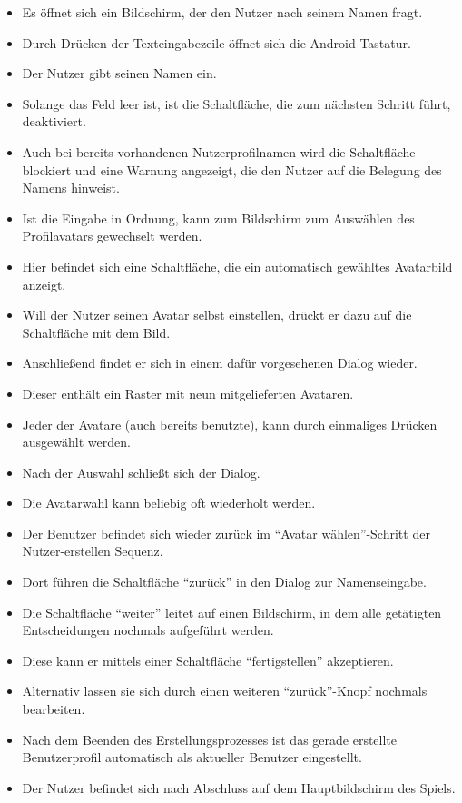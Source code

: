 \begin{itemize}
\item Es öffnet sich ein Bildschirm, der den Nutzer nach seinem Namen fragt.
\item Durch Drücken der Texteingabezeile öffnet sich die Android Tastatur.
\item Der Nutzer gibt seinen Namen ein. 
\item Solange das Feld leer ist, ist die Schaltfläche, die zum nächsten Schritt führt, deaktiviert.
\item  Auch bei bereits vorhandenen Nutzerprofilnamen wird die Schaltfläche blockiert und eine Warnung angezeigt,
die den Nutzer auf die Belegung des Namens hinweist. 
\item Ist die Eingabe in Ordnung, kann zum Bildschirm zum Auswählen des Profilavatars gewechselt werden.
\item Hier befindet sich eine Schaltfläche, die ein automatisch gewähltes Avatarbild anzeigt.
\item Will der Nutzer seinen Avatar selbst einstellen, drückt er dazu auf die Schaltfläche mit dem Bild.
\item Anschließend findet er sich in einem dafür vorgesehenen Dialog wieder.
\item Dieser enthält ein Raster mit neun mitgelieferten Avataren.
\item Jeder der Avatare (auch bereits benutzte), kann durch einmaliges Drücken ausgewählt werden.
\item Nach der Auswahl schließt sich der Dialog.
\item Die Avatarwahl kann beliebig oft wiederholt werden.
\item Der Benutzer befindet sich wieder zurück im ``Avatar wählen''-Schritt der Nutzer-erstellen Sequenz.
\item Dort führen die Schaltfläche ``zurück'' in den Dialog zur Namenseingabe.
\item Die Schaltfläche ``weiter'' leitet auf einen Bildschirm, in dem alle getätigten Entscheidungen
nochmals aufgeführt werden. 
\item Diese kann er mittels einer Schaltfläche ``fertigstellen'' akzeptieren.
\item Alternativ lassen sie sich durch einen weiteren ``zurück''-Knopf 
nochmals bearbeiten.
\item Nach dem Beenden des Erstellungsprozesses ist das gerade erstellte 
Benutzerprofil automatisch als aktueller Benutzer eingestellt.
\item Der Nutzer befindet sich nach Abschluss auf dem Hauptbildschirm des Spiels.
\end{itemize}
